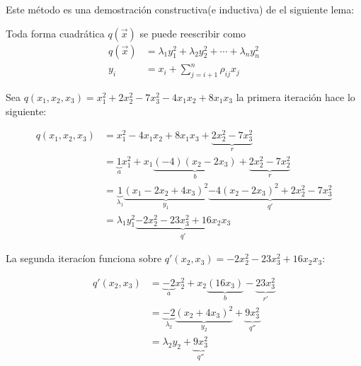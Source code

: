 Este método es una demostración constructiva(e inductiva) de el siguiente lema:

\begin{lemma}
Toda forma cuadrática $q\left(\overrightarrow{x}\right)$ se puede reescribir como
\begin{equation}
\begin{split}
q\left(\overrightarrow{x}\right) & =\lambda_{1}y_{1}^{2} + \lambda_{2}y_{2}^{2} + \cdots + \lambda_{n}y_{n}^{2}\\
y_{i} & = x_{i} + \sum_{j=i+1}^{n}\rho_{ij}x_{j}
\end{split}
\label{ecuacion:2.3}
\end{equation}
\label{lema:2.3}
\end{lemma}

\begin{example}

 Sea $q\left(x_{1}, x_{2}, x_{3}\right) = x_{1}^{2} + 2x_{2}^{2} - 7x_{3}^{2} - 4x_{1}x_{2} + 8x_{1}x_{3}$ la primera iteración hace lo siguiente:
 
 \begin{equation*}
\begin{split}
q\left(x_{1}, x_{2}, x_{3}\right) & = x_{1}^{2} - 4x_{1}x_{2} + 8x_{1}x_{3} +  \underbrace{2x_{2}^{2} - 7x_{3}^{2}}_{r}\\
 & = \underbrace{1}_{a}x_{1}^{2} + x_{1} \underbrace{\left(-4\right)\left(x_{2} - 2x_{3}\right)}_{b} + \underbrace{2x_{2}^{2} - 7x_{2}^{2}}_{r}\\
 & = \underbrace{1}_{\lambda_{1}} \underbrace{\left(x_{1} - 2x_{2} + 4x_{3}\right)^{2}}_{y_{1}} \underbrace{- 4\left(x_{2} - 2x_{3}\right)^{2} + 2x_{2}^{2} - 7x_{3}^{2}}_{q'}\\
 & = \lambda_{1}y_{1}^{2} \underbrace{- 2x_{2}^{2} - 23x_{3}^{2} + 16x_{2}x_{3}}_{q'}
\end{split}
\end{equation*}

La segunda iteracíon funciona sobre $q'\left(x_{2}, x_{3} \right) = -2x_{2}^{2} - 23x_{3}^{2} + 16x_{2}x_{3}$:

\begin{equation*}
\begin{split}
q'\left(x_{2}, x_{3}\right) & = \underbrace{-2}_{a}x_{2}^{2} + x_{2}\underbrace{\left(16x_{3}\right)}_{b} - \underbrace{23x_{3}^{2}}_{r'}\\
 & = \underbrace{-2}_{\lambda_{2}}\underbrace{\left(x_{2} + 4x_{3}\right)^{2}}_{y_{2}} + \underbrace{9x_{3}^{2}}_{q''}\\
 & = \lambda_{2}y_{2} + \underbrace{9x_{3}^{2}}_{q''}
\end{split}
\end{equation*}


\end{example}
